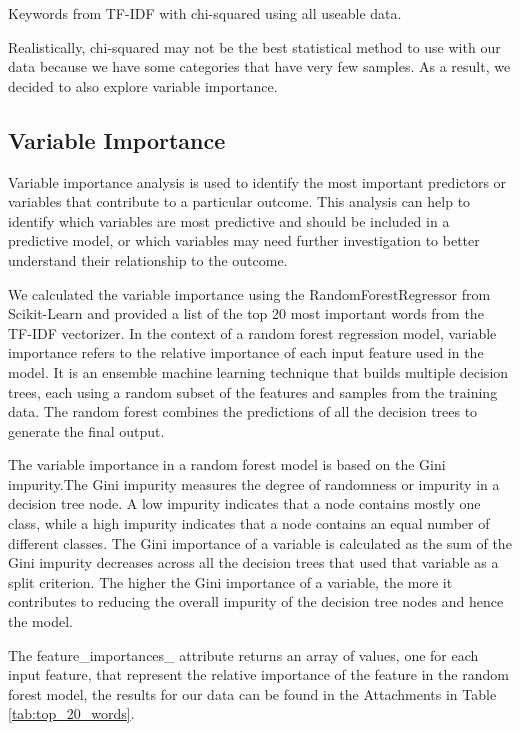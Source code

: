 \begin{table}[!ht]
\centering
\caption{Keywords from TF-IDF with chi-squared using all useable data.}

\label{tab:correlated_unigrams_all}
\end{table}

Realistically, chi-squared may not be the best statistical method to use with our data because we have some categories that have very few samples. As a result, we decided to also explore variable importance.

\subsection{Variable Importance}

Variable importance analysis is used to identify the most important predictors or variables that contribute to a particular outcome. This analysis can help to identify which variables are most predictive and should be included in a predictive model, or which variables may need further investigation to better understand their relationship to the outcome.

We calculated the variable importance using the RandomForestRegressor from Scikit-Learn and provided a list of the top 20 most important words from the TF-IDF vectorizer. In the context of a random forest regression model, variable importance refers to the relative importance of each input feature used in the model. It is an ensemble machine learning technique that builds multiple decision trees, each using a random subset of the features and samples from the training data. The random forest combines the predictions of all the decision trees to generate the final output. 

The variable importance in a random forest model is based on the Gini impurity.The Gini impurity measures the degree of randomness or impurity in a decision tree node. A low impurity indicates that a node contains mostly one class, while a high impurity indicates that a node contains an equal number of different classes. The Gini importance of a variable is calculated as the sum of the Gini impurity decreases across all the decision trees that used that variable as a split criterion. The higher the Gini importance of a variable, the more it contributes to reducing the overall impurity of the decision tree nodes and hence the model. 

The feature\_importances\_ attribute returns an array of values, one for each input feature, that represent the relative importance of the feature in the random forest model, the results for our data can be found in the Attachments in Table \ref{tab:top_20_words}.

